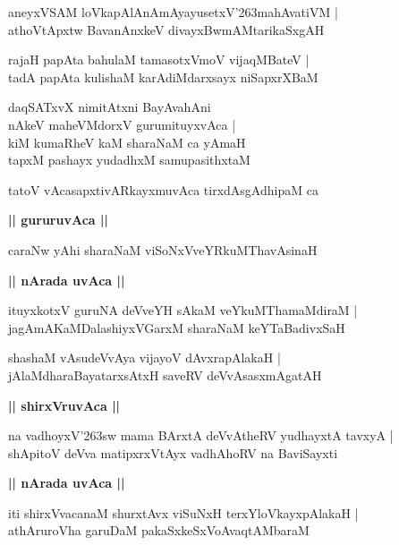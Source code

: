 \documentclass[twoside,12pt,openright]{book}
\def\S{\char'263}
\newcounter{shloka}[chapter]
\def\uvaca#1{\centerline{{\large\textbf{#1}}}}
\begin{document}
\begin{shloka}%
aneyxVSAM loVkapAlAnAmAyayusetxV\S mahAvatiVM |\\
athoVtApxtw BavanAnxkeV divayxBwmAMtarikaSxgAH 
\end{shloka}

\begin{shloka}%
rajaH papAta bahulaM tamasotxVmoV vijaqMBateV |\\
tadA papAta kulishaM karAdiMdarxsayx niSapxrXBaM
\end{shloka}

\begin{shloka}%
daqSATxvX nimitAtxni BayAvahAni \\
nAkeV maheVMdorxV gurumituyxvAca |\\
kiM kumaRheV kaM sharaNaM ca yAmaH \\
tapxM pashayx yudadhxM samupasithxtaM 
\end{shloka}

\begin{shloka}%
tatoV vAcasapxtivARkayxmuvAca tirxdAsgAdhipaM ca 
\end{shloka}

\uvaca{|| gururuvAca ||}

\begin{shloka}%
caraNw yAhi sharaNaM viSoNxVveYRkuMThavAsinaH 
\end{shloka}

\uvaca{|| nArada uvAca ||}

\begin{shloka}%
ituyxkotxV guruNA deVveYH sAkaM veYkuMThamaMdiraM |\\
jagAmAKaMDalashiyxVGarxM sharaNaM keYTaBadivxSaH 
\end{shloka}

\begin{shloka}%
shashaM vAsudeVvAya vijayoV dAvxrapAlakaH |\\
jAlaMdharaBayatarxsAtxH saveRV deVvAsasxmAgatAH 
\end{shloka}

\uvaca{|| shirxVruvAca ||}

\begin{shloka}%
na vadhoyxV\S sw mama BArxtA deVvAtheRV yudhayxtA tavxyA |\\
shApitoV deVva matipxrxVtAyx vadhAhoRV na BaviSayxti
\end{shloka}

\uvaca{|| nArada uvAca ||}

\begin{shloka}%
iti shirxVvacanaM shurxtAvx viSuNxH terxYloVkayxpAlakaH |\\
athAruroVha garuDaM pakaSxkeSxVoAvaqtAMbaraM 
\end{shloka}
\end{document}

